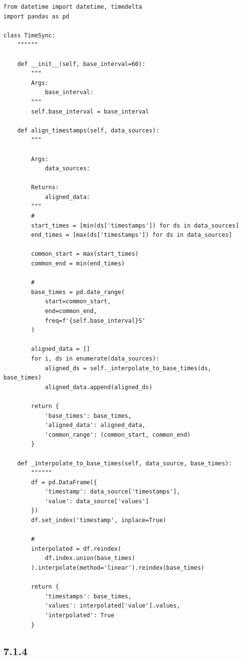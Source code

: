 \begin{lstlisting}[style=python]
from datetime import datetime, timedelta
import pandas as pd

class TimeSync:
    """"""
    
    def __init__(self, base_interval=60):
        """
        Args:
            base_interval: 
        """
        self.base_interval = base_interval
    
    def align_timestamps(self, data_sources):
        """

        Args:
            data_sources: 
            
        Returns:
            aligned_data: 
        """
        # 
        start_times = [min(ds['timestamps']) for ds in data_sources]
        end_times = [max(ds['timestamps']) for ds in data_sources]
        
        common_start = max(start_times)
        common_end = min(end_times)
        
        # 
        base_times = pd.date_range(
            start=common_start,
            end=common_end,
            freq=f'{self.base_interval}S'
        )
        
        aligned_data = []
        for i, ds in enumerate(data_sources):
            aligned_ds = self._interpolate_to_base_times(ds, base_times)
            aligned_data.append(aligned_ds)
        
        return {
            'base_times': base_times,
            'aligned_data': aligned_data,
            'common_range': (common_start, common_end)
        }
    
    def _interpolate_to_base_times(self, data_source, base_times):
        """"""
        df = pd.DataFrame({
            'timestamp': data_source['timestamps'],
            'value': data_source['values']
        })
        df.set_index('timestamp', inplace=True)
        
        # 
        interpolated = df.reindex(
            df.index.union(base_times)
        ).interpolate(method='linear').reindex(base_times)
        
        return {
            'timestamps': base_times,
            'values': interpolated['value'].values,
            'interpolated': True
        }
\end{lstlisting}

\hypertarget{section-40}{%
\subsection{7.1.4}\label{section-40}}

